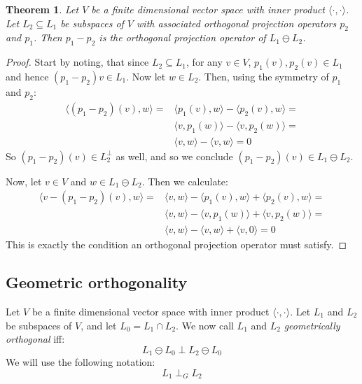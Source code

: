 \documentclass[12pt, a4paper]{article}
\newtheorem{theorem}{Theorem}[section]
\numberwithin{equation}{section}
\begin{document}
\begin{theorem}
\label{projection_lemma3}
Let $V$ be a finite dimensional vector space with inner product $\langle\cdot,\cdot\rangle$. Let $L_2\subseteq L_1$ be subspaces of $V$ with associated orthogonal projection operators $p_2$ and $p_1$. Then $p_1-p_2$ is the orthogonal projection operator of $L_1\ominus L_2$.
\end{theorem}
\begin{proof}
Start by noting, that since $L_2\subseteq L_1$, for any $v\in V$, $p_1(v),p_2(v)\in L_1$ and hence $(p_1-p_2)v\in L_1$. Now let $w\in L_2$. Then, using the symmetry of $p_1$ and $p_2$:
\begin{align}
\langle(p_1-p_2)(v),w\rangle=&\langle p_1(v),w\rangle-\langle p_2(v),w\rangle=\\
&\langle v,p_1(w)\rangle-\langle v,p_2(w)\rangle=\\
&\langle v,w\rangle-\langle v,w\rangle=0
\end{align}
So $(p_1-p_2)(v)\in L_2^\perp$ as well, and so we conclude $(p_1-p_2)(v)\in L_1\ominus L_2$.

Now, let $v\in V$ and $w\in L_1\ominus L_2$. Then we calculate:
\begin{align}
\langle v-(p_1-p_2)(v),w\rangle=&\langle v,w\rangle-\langle p_1(v),w\rangle+\langle p_2(v),w\rangle=\\
&\langle v,w\rangle-\langle v,p_1(w)\rangle+\langle v,p_2(w)\rangle=\\
&\langle v,w\rangle-\langle v,w\rangle+\langle v,0\rangle=0
\end{align}
This is exactly the condition an orthogonal projection operator must satisfy.
\end{proof}

\subsection{Geometric orthogonality}
Let $V$ be a finite dimensional vector space with inner product $\langle\cdot,\cdot\rangle$. Let $L_1$ and $L_2$ be subspaces of $V$, and let $L_0=L_1\cap L_2$. We now call $L_1$ and $L_2$ \textit{geometrically orthogonal} iff:
\begin{equation}
L_1\ominus L_0\perp L_2\ominus L_0
\end{equation}
We will use the following notation:
\begin{equation}
L_1\perp_G L_2
\end{equation}
\end{document}
